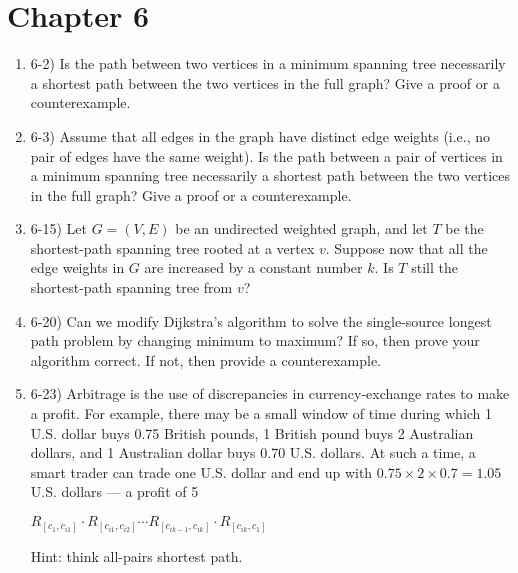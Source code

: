 \documentclass{article}
\begin{document}
\section{Chapter 6}
\begin{enumerate}
    \item 6-2) Is the path between two vertices in a minimum spanning tree necessarily a shortest path between the two vertices in the full graph? Give a proof or a counterexample.
    
    \item 6-3) Assume that all edges in the graph have distinct edge weights (i.e., no pair of edges have the same weight). Is the path between a pair of vertices in a minimum spanning tree necessarily a shortest path between the two vertices in the full graph? Give a proof or a counterexample.
    
    \item 6-15) Let $G = (V,E)$ be an undirected weighted graph, and let $T$ be the shortest-path spanning tree rooted at a vertex $v$. Suppose now that all the edge weights in $G$ are increased by a constant number $k$. Is $T$ still the shortest-path spanning tree from $v$?
    
    \item 6-20) Can we modify Dijkstra's algorithm to solve the single-source longest path problem by changing minimum to maximum? If so, then prove your algorithm correct. If not, then provide a counterexample.
    
    \item 6-23) Arbitrage is the use of discrepancies in currency-exchange rates to make a profit. For example, there may be a small window of time during which 1 U.S. dollar buys 0.75 British pounds, 1 British pound buys 2 Australian dollars, and 1 Australian dollar buys 0.70 U.S. dollars. At such a time, a smart trader can trade one U.S. dollar and end up with $0.75  \times  2  \times  0.7 = 1.05$ U.S. dollars — a profit of 5
    
    \(R_{[c_1, c_{i1}]} \cdot R_{[c_{i1}, c_{i2}]} \cdots R_{[c_{ik-1}, c_{ik}]} \cdot R_{[c_{ik}, c_1]}\)

    Hint: think all-pairs shortest path.
\end{enumerate}
\end{document}
